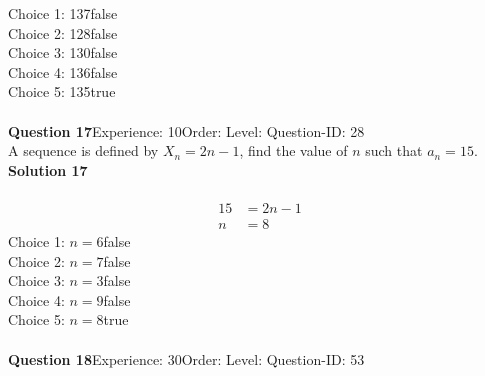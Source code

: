 \documentclass{article}
\begin{document}
Choice 1: \hspace{20pt}137\hspace{20pt}false\\
Choice 2: \hspace{20pt}128\hspace{20pt}false\\
Choice 3: \hspace{20pt}130\hspace{20pt}false\\
Choice 4: \hspace{20pt}136\hspace{20pt}false\\
Choice 5: \hspace{20pt}135\hspace{20pt}true\\
\\[4pt]
\noindent\textbf{Question 17}\hspace{20pt}Experience: 10\hspace{20pt}Order: \hspace{20pt}Level: \hspace{20pt}Question-ID: 28\\[2pt]
A sequence is defined by $X_n=2n-1$, find the value of $n$ such that $a_n=15$.\\[4pt]
\noindent\textbf{Solution 17}\\[2pt]
\\[-35pt]\begin{align*}
15&=2n-1\\[2pt]
n&=8
\end{align*}
Choice 1: \hspace{20pt}$n=6$\hspace{20pt}false\\
Choice 2: \hspace{20pt}$n=7$\hspace{20pt}false\\
Choice 3: \hspace{20pt}$n=3$\hspace{20pt}false\\
Choice 4: \hspace{20pt}$n=9$\hspace{20pt}false\\
Choice 5: \hspace{20pt}$n=8$\hspace{20pt}true\\
\\[4pt]
\noindent\textbf{Question 18}\hspace{20pt}Experience: 30\hspace{20pt}Order: \hspace{20pt}Level: \hspace{20pt}Question-ID: 53\\[2pt]
\end{document}

